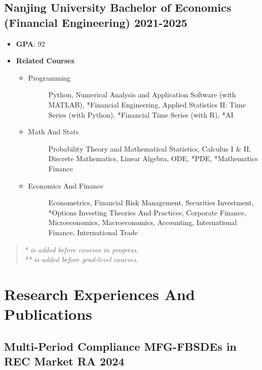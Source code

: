 \documentclass[a4paper]{article}
\begin{document}
\subsection{Nanjing University \normalfont \hfill Bachelor of Economics (Financial Engineering)  \hfill 2021-2025}
\begin{itemize}
    \item \textbf{GPA}: 92
    \item \textbf{Related Courses}
    \begin{itemize}
        \item\begin{description}
            \item[Programming] Python, Numerical Analysis and Application Software (with MATLAB), *Financial Engineering, Applied Statistics II: Time Series (with Python), *\hypertarget{FinTS}{Financial Time Series} (with R), *AI
        \end{description}
        \item\begin{description}
            \item[Math And Stats] Probability Theory and Mathematical Statistics, Calculus I \& II, Discrete Mathematics, Linear Algebra, ODE, *PDE, *Mathematics Finance
        \end{description}
        \item\begin{description}
            \item[Economics And Finance] Econometrics, Financial Risk Management, Securities Investment, *Options Investing Theories And Practices, Corporate Finance, Microeconomics, Macroeconomics, Accounting, International Finance, International Trade
        \end{description} 
    \end{itemize} 
\end{itemize}   

\begin{quote}
    \itshape
    * is added before courses in progress.\\
    ** is added before grad-level courses.
\end{quote}

\section{Research Experiences And Publications}  %

\hypertarget{FBSDEs}{
    \subsection{Multi-Period Compliance MFG-FBSDEs in REC Market \normalfont \hfill RA \hfill 2024}}
    
\end{document}
